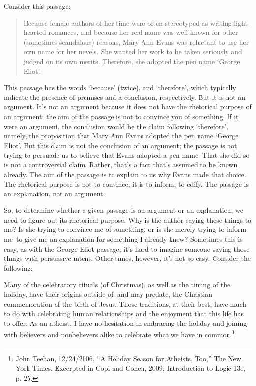 Consider this passage:

\begin{quotation}
Because female authors of her time were often stereotyped as writing light-hearted
romances, and because her real name was well-known for other (sometimes scandalous)
reasons, Mary Ann Evans was reluctant to use her own name for her novels. She wanted
her work to be taken seriously and judged on its own merits. Therefore, she adopted the
pen name `George Eliot'.
\end{quotation}

This passage has the words `because' (twice), and `therefore', which typically indicate the
presence of premises and a conclusion, respectively. But it is not an argument. It's not an argument
because it does not have the rhetorical purpose of an argument: the aim of the passage is not to
convince you of something. If it were an argument, the conclusion would be the claim following
`therefore', namely, the proposition that Mary Ann Evans adopted the pen name `George Eliot'.
But this claim is not the conclusion of an argument; the passage is not trying to persuade us to
believe that Evans adopted a pen name. That she did so is not a controversial claim. Rather, that's
a fact that's assumed to be known already. The aim of the passage is to explain to us why Evans
made that choice. The rhetorical purpose is not to convince; it is to inform, to edify. The passage
is an explanation, not an argument.

So, to determine whether a given passage is an argument or an explanation, we need to figure out
its rhetorical purpose. Why is the author saying these things to me? Is she trying to convince me
of something, or is she merely trying to inform me--to give me an explanation for something I
already knew? Sometimes this is easy, as with the George Eliot passage; it's hard to imagine
someone saying those things with persuasive intent. Other times, however, it's not so easy.
Consider the following:

Many of the celebratory rituals (of Christmas), as well as the timing of the holiday, have
their origins outside of, and may predate, the Christian commemoration of the birth of
Jesus. Those traditions, at their best, have much to do with celebrating human relationships
and the enjoyment that this life has to offer. As an atheist, I have no hesitation in embracing
the holiday and joining with believers and nonbelievers alike to celebrate what we have in
common.\footnote{John Teehan, 12/24/2006, ``A Holiday Season for Atheists, Too,'' The New York 
Times. Excerpted in Copi and Cohen,
2009, Introduction to Logic 13e, p. 25.}

